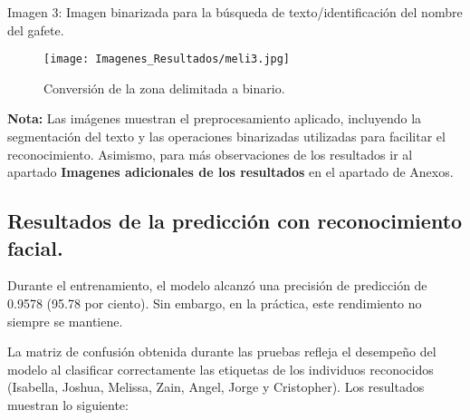 \documentclass[12pt, letterpaper]{article}
\begin{document}
Imagen 3: Imagen binarizada para la búsqueda de texto/identificación del nombre del gafete.
\begin{figure}[H]
    \centering
    \texttt{[image: Imagenes\_Resultados/meli3.jpg]} %
    \caption{Conversión de la zona delimitada a binario.}
    \label{fig:etiqueta}
\end{figure}



\textbf{Nota:} Las imágenes muestran el preprocesamiento aplicado, incluyendo la segmentación del texto y las operaciones binarizadas utilizadas para facilitar el reconocimiento. Asimismo, para más observaciones de los resultados ir al apartado \textbf{Imagenes adicionales de los resultados} en el apartado de Anexos.





\subsection{Resultados de la predicción con reconocimiento facial.}
Durante el entrenamiento, el modelo alcanzó una precisión de predicción de 0.9578 (95.78 por ciento). Sin embargo, en la práctica, este rendimiento no siempre se mantiene. \par

La matriz de confusión obtenida durante las pruebas refleja el desempeño del modelo al clasificar correctamente las etiquetas de los individuos reconocidos (Isabella, Joshua, Melissa, Zain, Angel, Jorge y Cristopher). Los resultados muestran lo siguiente:
\end{document}
